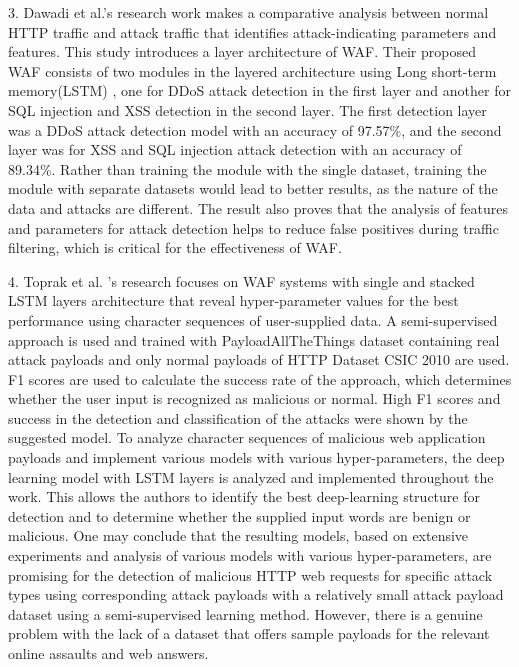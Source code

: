 3.	Dawadi et al.\cite{Dawadi}'s research work makes a comparative analysis between normal HTTP traffic and attack traffic that identifies attack-indicating parameters and features. This study introduces a layer architecture of WAF. Their proposed WAF consists of two modules in the layered architecture using Long short-term memory(LSTM) , one for DDoS attack detection in the first layer and another for SQL injection and XSS detection in the second layer. The first detection layer was a DDoS attack detection model with an accuracy of 97.57\%, and the second layer was for XSS and SQL injection attack detection with an accuracy of 89.34\%. Rather than training the module with the single dataset, training the module with separate datasets would lead to better results, as the nature of the data and attacks are different. The result also proves that the analysis of features and parameters for attack detection helps to reduce false positives during traffic filtering, which is critical for the effectiveness of WAF.


4.	Toprak et al. \cite{Toprak}'s research focuses on WAF systems with single and stacked LSTM layers architecture that reveal hyper-parameter values for the best performance using character sequences of user-supplied data. A semi-supervised approach is used and trained with PayloadAllTheThings dataset containing real attack payloads and only normal payloads of HTTP Dataset CSIC 2010 are used. F1 scores are used to calculate the success rate of the approach, which determines whether the user input is recognized as malicious or normal. High F1 scores and success in the detection and classification of the attacks were shown by the suggested model.
To analyze character sequences of malicious web application payloads and implement various models with various hyper-parameters, the deep learning model with LSTM layers is analyzed and implemented throughout the work. This allows the authors to identify the best deep-learning structure for detection and to determine whether the supplied input words are benign or malicious. One may conclude that the resulting models, based on extensive experiments and analysis of various models with various hyper-parameters, are promising for the detection of malicious HTTP web requests for specific attack types using corresponding attack payloads with a relatively small attack payload dataset using a semi-supervised learning method. However, there is a genuine problem with the lack of a dataset that offers sample payloads for the relevant online assaults and web answers.

